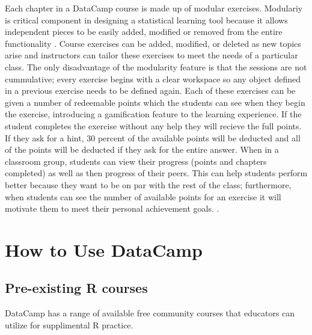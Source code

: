 \documentclass{tise_style}
\begin{document}
Each chapter in a DataCamp course is made up of modular exercises. Modulariy is critical component in designing a statistical
learning tool because it allows independent pieces to be easily added, modified or removed from the entire functionality 
\citep{Hare2017}. Course exercises can be added, modified, or deleted as new topics arise and instructors can tailor
these exercises to meet the needs of a particular class. The only disadvantage of the modularity feature is that the sessions
are not cummulative; every exercise begins with a clear workspace so any object defined in a previous exercise needs to be 
defined again. Each of these exercises can be given a number of redeemable points which the students can see when they begin
the exercise, introducing a gamification feature to the learning experience. If the student completes the exercise without 
any help they will recieve the full points. If they ask for a hint, 30 percent of the available points will be deducted and 
all of the points will be deducted if they ask for the entire answer. When in a classroom group, students can view their 
progress (points and chapters completed) as well as then progress of their peers. This can help students perform better 
because they want to be on par with the rest of the class; furthermore, when students can see the number of available points 
for an exercise it will motivate them to meet their personal achievement goals. \citep{Chang2016}. 




\section{How to Use DataCamp}

\subsection{Pre-existing R courses}
DataCamp has a range of available free community courses that educators can utilize for supplimental R practice.
\end{document}
